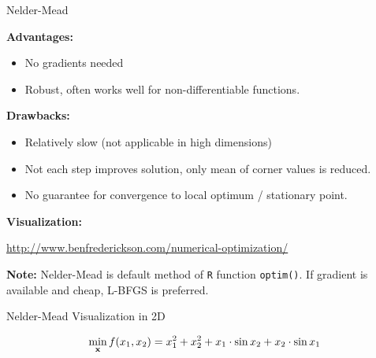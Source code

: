\documentclass[11pt,compress,t,notes=noshow, xcolor=table]{beamer}
\begin{document}
\begin{vbframe}{Nelder-Mead}
\small

\textbf{Advantages:}
\begin{itemize}
    \item No gradients needed
    \item Robust, often works well for non-differentiable functions.
\end{itemize}
\textbf{Drawbacks:}
\begin{itemize}
    \item Relatively slow (not applicable in high dimensions)
    \item Not each step improves solution, only mean of corner values is reduced.
    \item No guarantee for convergence to local optimum / stationary point.
\end{itemize}

\textbf{Visualization:}
\begin{center}
    \url{http://www.benfrederickson.com/numerical-optimization/}
\end{center}

\vspace{0.3cm}
\textbf{Note:} Nelder-Mead is default method of \texttt{R} function \texttt{optim()}.
If gradient is available and cheap, L-BFGS is preferred.

\end{vbframe}


\begin{frame}{Nelder-Mead Visualization in 2D}

$$\min_{\mathbf{x}} f(x_1,x_2) = x_1^{2} + x_2^{2} + x_1\cdot \sin x_2 + x_2 \cdot \sin x_1 $$ 



\end{frame}
\end{document}
